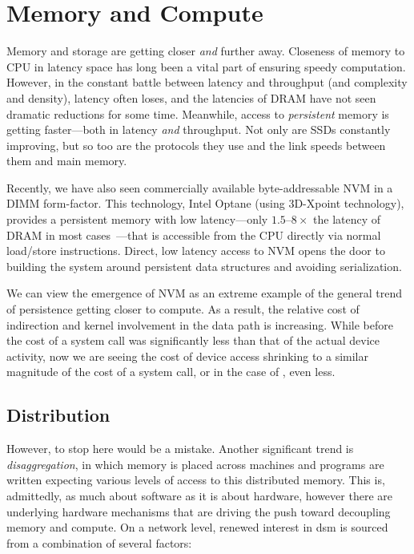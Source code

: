 \section{Memory and Compute}

Memory and storage are getting closer \emph{and} further away. Closeness of memory to CPU in latency space has long been a vital part of ensuring speedy
computation. However, in the constant battle between latency and throughput (and complexity and density), latency often
loses, and the latencies of DRAM have not seen dramatic reductions
for some time. Meanwhile, access to \emph{persistent} memory is getting faster---both in latency \emph{and} throughput.
Not only are SSDs constantly improving, but so too are the protocols they use and the link speeds between them and main
memory.

Recently, we have also seen commercially available byte-addressable NVM
in a DIMM form-factor. This technology, Intel Optane (using 3D-Xpoint technology), provides a persistent memory
with low latency---only $1.5$--$8\times$ the latency of DRAM in most cases~\cite{ucsd_bnvm}---that is accessible from the CPU directly via normal load/store instructions. Direct, low latency
access to NVM opens the door to building the system around persistent data structures and avoiding serialization.

We can view the emergence of NVM as an extreme example of the general trend of persistence getting closer to compute. As a result, the relative cost of indirection and kernel involvement in
the data path is increasing. While before the cost of a system call was significantly less than that of the actual device activity, now we are seeing the cost of device access shrinking to a
similar magnitude of the cost of a system call, or in the case of \NVM, even less.

\subsection{Distribution}

However, to stop here would be a mistake. Another significant trend is \emph{disaggregation}, in which memory is placed across machines and programs are written expecting various levels of
access to this distributed memory. This is, admittedly, as much about software as it is about hardware, however there are underlying hardware mechanisms that are driving the push toward
decoupling memory and compute. On a network level, renewed interest in \ac{dsm} is sourced from a combination of several factors:

